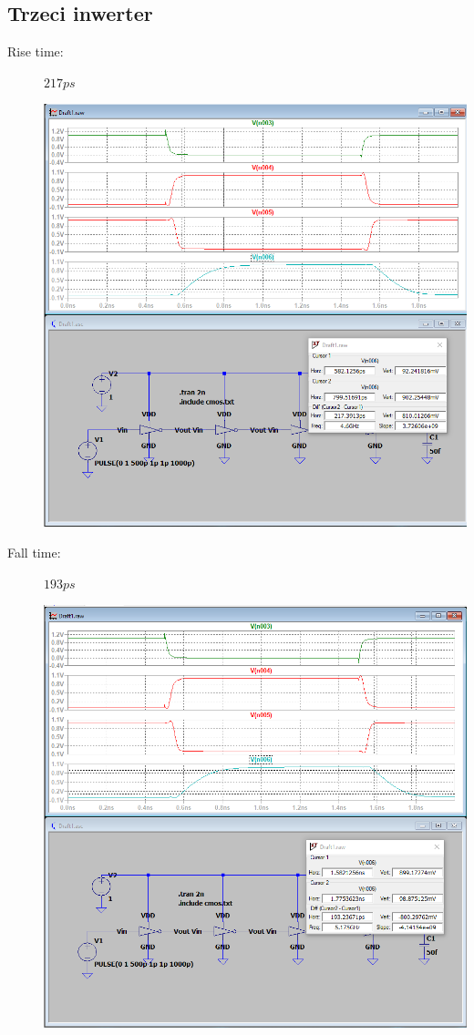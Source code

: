 \documentclass[a4paper, 11pt]{article}
\begin{document}
\subsection{Trzeci inwerter}
\begin{description}
	\item[Rise time:] $217 ps$ \hfill
	      \begin{center}
		      \includegraphics[scale=0.38]{mikro_lab3/rise_time3.PNG}
	      \end{center}
	\item[Fall time:] $193 ps$ \hfill
	      \begin{center}
		      \includegraphics[scale=0.38]{mikro_lab3/fall_time3.PNG}

\end{center}
\end{description}
\end{document}
